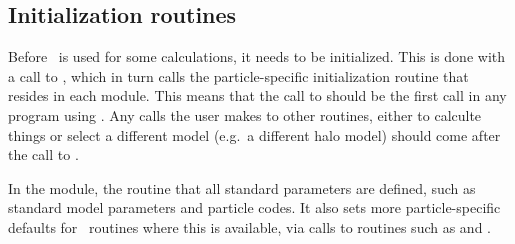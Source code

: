 
\subsection{Initialization routines}

Before \ds\ is used for some calculations, it needs to be
initialized. This is done with a call to , 
which in turn calls the particle-specific initialization routine 
 that resides in each module.
This means that the call to  should be the first call in
any program using \ds. Any calls the user makes to other routines,
either to calculte things or select a different model (e.g.\ a
different halo model) should come after the call to .

In the  module, the routine   that all standard parameters 
are defined, such as standard model parameters and particle codes.
 It also sets more particle-specific defaults for \ds\ routines where this is
 available, via calls to routines such as   
 and .


